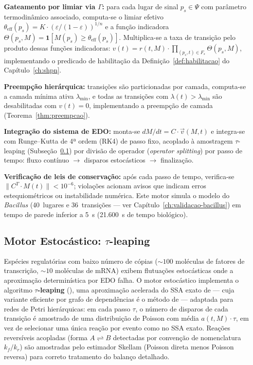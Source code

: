 \textbf{Gateamento por limiar via $\Gamma$:} para cada lugar de sinal
$p_s \in \Psi$ com parâmetro termodinâmico associado, computa-se o limiar
efetivo $\theta_{\text{eff}}(p_s) = K \cdot (\varepsilon /
(1 - \varepsilon))^{1/n}$ e a função indicadora
$\Theta(p_s, M) = \mathbf{1}[M(p_s) \geq \theta_{\text{eff}}(p_s)]$.
Multiplica-se a taxa de transição pelo produto dessas funções indicadoras:
$v(t) = r(t, M) \cdot \prod_{(p_s,t) \in F_s} \Theta(p_s, M)$,
implementando o predicado de habilitação da
Definição~\ref{def:habilitacao} do Capítulo~\ref{ch:shpn}.

\textbf{Preempção hierárquica:} transições são particionadas por camada, computa-se
a camada mínima ativa $\lambda_{\min}$, e todas as transições com
$\lambda(t) > \lambda_{\min}$ são desabilitadas com $v(t) = 0$, implementando
a preempção de camada (Teorema~\ref{thm:preempcao}).

\textbf{Integração do sistema de EDO:} monta-se $dM/dt = C \cdot \vec{v}(M, t)$
e integra-se com Runge--Kutta de 4ª ordem (RK4) de passo fixo, acoplado
à amostragem $\tau$-leaping (Subseção~\ref{subsec:motor-estocastico})
por divisão de operador (\emph{operator splitting}) por passo de tempo:
fluxo contínuo $\to$ disparos estocásticos $\to$ finalização.

\textbf{Verificação de leis de conservação:} após cada passo de tempo,
verifica-se $\|C^T \cdot M(t)\| < 10^{-6}$; violações acionam avisos que
indicam erros estequiométricos ou instabilidade numérica.
Este motor simula o modelo do \textit{Bacillus} (40~lugares e
36~transições --- ver
Capítulo~\ref{ch:validacao-bacillus}) em tempo de parede inferior a 5~s
(21.600~s de tempo biológico).

\subsection{Motor Estocástico: $\tau$-leaping}
\label{subsec:motor-estocastico}

Espécies regulatórias com baixo número de cópias ($\sim\!100$ moléculas de
fatores de transcrição, $\sim\!10$ moléculas de mRNA) exibem flutuações
estocásticas onde a aproximação determinística por EDO falha.
O motor estocástico implementa o algoritmo \textbf{$\tau$-leaping}
(\textcite{Gillespie2001}), uma aproximação acelerada do SSA exato de
\textcite{Gillespie1977} --- cuja variante eficiente por grafo de dependências
é o método de \textcite{Gibson2000} --- adaptada para redes de Petri hierárquicas: em
cada passo $\tau$, o número de disparos de cada transição é amostrado de
uma distribuição de Poisson com média $a(t,M)\cdot\tau$, em vez de
selecionar uma única reação por evento como no SSA exato.
Reações reversíveis acopladas (forma $A \rightleftharpoons B$ detectadas
por convenção de nomenclatura $k_f / k_r$) são amostradas pelo estimador
Skellam (Poisson direta menos Poisson reversa) para correto tratamento
do balanço detalhado.

